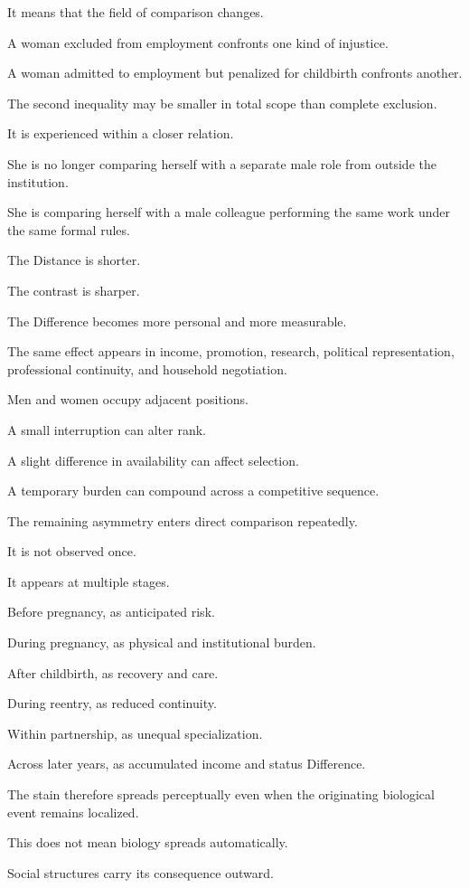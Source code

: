 It means that the field of comparison changes.

A woman excluded from employment confronts one kind of injustice.

A woman admitted to employment but penalized for childbirth confronts another.

The second inequality may be smaller in total scope than complete exclusion.

It is experienced within a closer relation.

She is no longer comparing herself with a separate male role from outside the institution.

She is comparing herself with a male colleague performing the same work under the same formal rules.

The Distance is shorter.

The contrast is sharper.

The Difference becomes more personal and more measurable.

The same effect appears in income, promotion, research, political representation, professional continuity, and household negotiation.

Men and women occupy adjacent positions.

A small interruption can alter rank.

A slight difference in availability can affect selection.

A temporary burden can compound across a competitive sequence.

The remaining asymmetry enters direct comparison repeatedly.

It is not observed once.

It appears at multiple stages.

Before pregnancy, as anticipated risk.

During pregnancy, as physical and institutional burden.

After childbirth, as recovery and care.

During reentry, as reduced continuity.

Within partnership, as unequal specialization.

Across later years, as accumulated income and status Difference.

The stain therefore spreads perceptually even when the originating biological event remains localized.

This does not mean biology spreads automatically.

Social structures carry its consequence outward.

